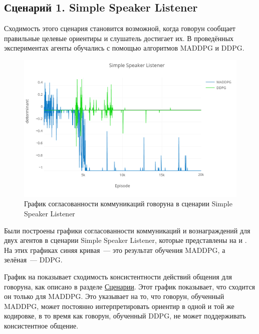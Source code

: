 \subsection{Сценарий 1. Simple Speaker Listener}

Сходимость этого сценария становится возможной, когда говорун сообщает правильные целевые ориентиры и слушатель достигает их. В проведённых экспериментах агенты обучались с помощью алгоритмов MADDPG и DDPG.

\begin{figure}[ht!]
    \center
    \includegraphics [scale=0.38] {my_folder/images/ch5/ssl-comm.png}
    \caption{График согласованности коммуникаций говоруна в сценарии Simple Speaker Listener}
    \label{fig:result-ssl-comm}
\end{figure}

Были построены графики согласованности коммуникаций и вознаграждений для двух агентов в сценарии Simple Speaker Listener, которые представлены на  и . На этих графиках синяя кривая~--- это результат обучения MADDPG, а зелёная~--- DDPG.

График на  показывает сходимость консистентности действий общения для говоруна, как описано в разделе \hyperref[exp-ssl]{Сценарии}. Этот график показывает, что сходится он только для MADDPG. Это указывает на то, что говорун, обученный MADDPG, может постоянно интерпретировать ориентир в одной и той же кодировке, в то время как говорун, обученный DDPG, не может поддерживать консистентное общение.

